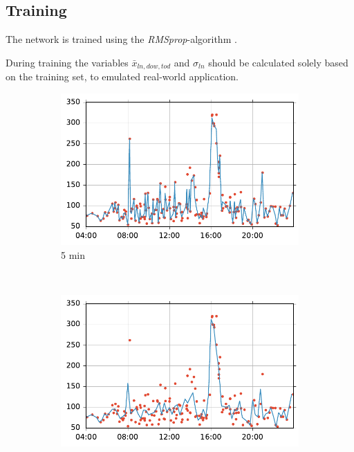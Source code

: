 \documentclass[preprint,11pt,5p,twocolumn]{elsarticle}
\begin{document}
\subsection{Training}
The network is trained using the \emph{RMSprop}-algorithm \cite{RMSprop}.

During training the variables $\mathit{\bar{x}_{\mathit{ln},\mathit{dow},\mathit{tod}}}$ and $\sigma_\mathit{ln}$ should be calculated solely based on the training set, to emulated real-world application.

\begin{figure}[!t]
    \centering
    \begin{subfigure}[t]{0.31\textwidth}
        \centering
        \includegraphics[width=\textwidth]{plots/decycle_5min.pdf}
        \caption{5 min}
    \end{subfigure}%
    ~ 
    \begin{subfigure}[t]{0.31\textwidth}
        \centering
        \includegraphics[width=\textwidth]{plots/decycle_15min.pdf}

\end{subfigure}
\end{figure}
\end{document}
